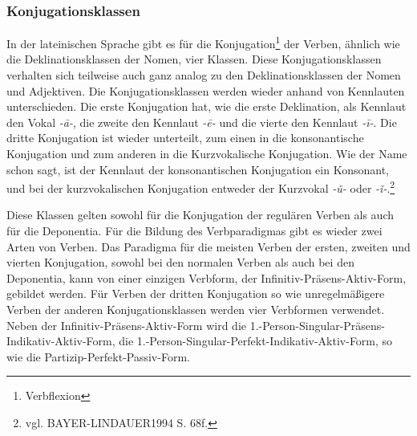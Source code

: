 \documentclass[12pt,abstract=on,titlepage,bibliography=totoc,ngerman,listof=totoc]{scrreprt}
\begin{document}
\subsubsection{Konjugationsklassen}
In der lateinischen Sprache gibt es für die Konjugation\footnote{Verbflexion} der Verben, ähnlich wie die Deklinationsklassen der Nomen, vier Klassen. Diese Konjugationsklassen verhalten sich teilweise auch ganz analog zu den Deklinationsklassen der Nomen und Adjektiven. Die Konjugationsklassen werden wieder anhand von Kennlauten unterschieden. Die erste Konjugation hat, wie die erste Deklination, als Kennlaut den Vokal \textit{-ā-}, die zweite den Kennlaut \textit{-ē-} und die vierte den Kennlaut \textit{-ī-}. Die dritte Konjugation ist wieder unterteilt, zum einen in die konsonantische Konjugation und zum anderen in die Kurzvokalische Konjugation. Wie der Name schon sagt, ist der Kennlaut der konsonantischen Konjugation ein Konsonant, und bei der kurzvokalischen Konjugation entweder der Kurzvokal \textit{-ǔ-} oder \textit{-ǐ-}.\footnote{vgl. BAYER-LINDAUER1994 S. 68f.} \par
Diese Klassen gelten sowohl für die Konjugation der regulären Verben als auch für die Deponentia. Für die Bildung des Verbparadigmas gibt es wieder zwei Arten von Verben. Das Paradigma für die meisten Verben der ersten, zweiten und vierten Konjugation, sowohl bei den normalen Verben als auch bei den Deponentia, kann von einer einzigen Verbform, der Infinitiv-Präsens-Aktiv-Form, gebildet werden. Für Verben der dritten Konjugation so wie unregelmäßigere Verben der anderen Konjugationsklassen werden vier Verbformen verwendet. Neben der Infinitiv-Präsens-Aktiv-Form wird die 1.-Person-Singular-Präsens-Indikativ-Aktiv-Form, die 1.-Person-Singular-Perfekt-Indikativ-Aktiv-Form, so wie die Partizip-Perfekt-Passiv-Form.  \par
\end{document}
